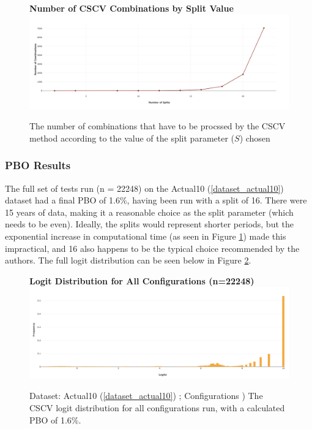 \documentclass[a4paper,11pt,oneside]{article}
\theoremstyle{plain}
\theoremstyle{definition}
\begin{document}
	\begin{figure}[H]
		\centering 
		\textbf{Number of CSCV Combinations by Split Value}
		\includegraphics[scale=0.25]{images/results/pbo/combination_sizes.png} 
		\caption[Number of CSCV Combinations by Split Value]{
			\newline The number of combinations that have to be procssed by the CSCV method according to the value of the split parameter ($S$) chosen}
		\label{figure-s_combinations}
	\end{figure}
	
	
	\subsubsection{PBO Results}
	
	
	The full set of tests run (n = 22248) on the Actual10 (\ref{dataset_actual10}) dataset had a final PBO of 1.6\%, having been run with a split of 16. There were 15 years of data, making it a reasonable choice as the split parameter (which needs to be even). Ideally, the splits would represent shorter periods, but the exponential increase in computational time (as seen in Figure \ref{figure-s_combinations}) made this impractical, and 16 also happens to be the typical choice recommended by the authors. The full logit distribution can be seen below in Figure \ref{figure-results_logits_all}.
	
	\begin{figure}[H]
		\centering 
		\textbf{Logit Distribution for All Configurations (n=22248)}
		\includegraphics[scale=0.25]{images/results/pbo/all_sets_dist.png} 
		\caption[Logit Distribution for All Configurations]{Dataset: Actual10 (\ref{dataset_actual10}) ; Configurations )
			\newline The CSCV logit distribution for all configurations run, with a calculated PBO of 1.6\%.}
		\label{figure-results_logits_all}
	\end{figure}
	
\end{document}
